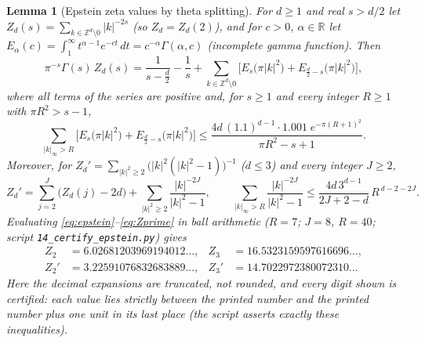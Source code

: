 \documentclass[11pt,a4paper]{article}
\newcommand{\R}{\mathbb R}
\newcommand{\Z}{\mathbb Z}
\theoremstyle{plain}
\newtheorem{lemma}[theorem]{Lemma}
\theoremstyle{definition}
\numberwithin{equation}{section}
\begin{document}
\begin{lemma}[Epstein zeta values by theta splitting]\label{lem:epstein}
For $d\ge1$ and real $s>d/2$ let $Z_d(s)=\sum_{k\in\Z^d\setminus0}|k|^{-2s}$ (so $Z_d=Z_d(2)$), and for $c>0$, $\alpha\in\R$ let $E_\alpha(c)=\int_1^\infty t^{\alpha-1}e^{-ct}\,dt=c^{-\alpha}\Gamma(\alpha,c)$ (incomplete gamma function). Then
\begin{equation}\label{eq:epstein}
\pi^{-s}\Gamma(s)\,Z_d(s)=\frac{1}{s-\frac d2}-\frac1s+\sum_{k\in\Z^d\setminus0}\Big[E_s\big(\pi|k|^2\big)+E_{\frac d2-s}\big(\pi|k|^2\big)\Big],
\end{equation}
where all terms of the series are positive and, for $s\ge1$ and every integer $R\ge1$ with $\pi R^2>s-1$,
\begin{equation}\label{eq:epsteintail}
\sum_{|k|_\infty>R}\Big[E_s\big(\pi|k|^2\big)+E_{\frac d2-s}\big(\pi|k|^2\big)\Big]\le\frac{4d\,(1.1)^{d-1}\cdot1.001\;e^{-\pi(R+1)^2}}{\pi R^2-s+1}.
\end{equation}
Moreover, for $Z_d'=\sum_{|k|^2\ge2}\big(|k|^2(|k|^2-1)\big)^{-1}$ ($d\le3$) and every integer $J\ge2$,
\begin{equation}\label{eq:Zprime}
Z_d'=\sum_{j=2}^{J}\big(Z_d(j)-2d\big)+\sum_{|k|^2\ge2}\frac{|k|^{-2J}}{|k|^2-1},\qquad \sum_{|k|_\infty>R}\frac{|k|^{-2J}}{|k|^2-1}\le\frac{4d\,3^{d-1}}{2J+2-d}\,R^{\,d-2-2J}.
\end{equation}
Evaluating \eqref{eq:epstein}--\eqref{eq:Zprime} in ball arithmetic ($R=7$; $J=8$, $R=40$; script \texttt{14\_certify\_epstein.py}) gives
\begin{equation}\label{eq:Zcert}
\begin{aligned}Z_2&=6.02681203969194012\ldots,&Z_3&=16.5323159597616696\ldots,\\ Z_2'&=3.22591076832683889\ldots,&Z_3'&=14.7022972380072310\ldots\end{aligned}
\end{equation}
Here the decimal expansions are \emph{truncated}, not rounded, and every digit shown is certified: each value lies strictly between the printed number and the printed number plus one unit in its last place (the script asserts exactly these inequalities).
\end{lemma}
\end{document}
